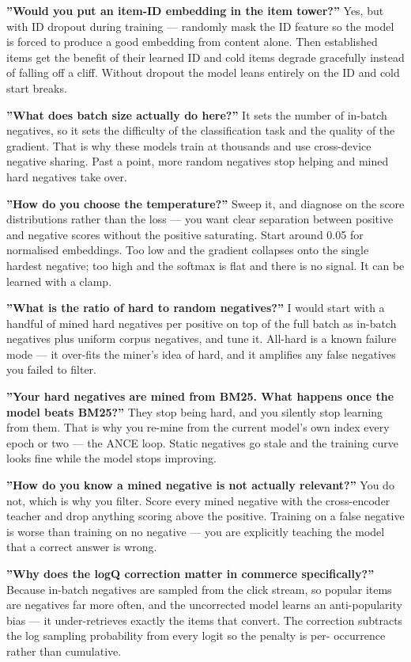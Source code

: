 \documentclass[10pt,twoside]{book}
\begin{document}
\textbf{''Would you put an item-ID embedding in the item tower?''} Yes, but with ID dropout during training --- randomly mask the ID feature so the model is forced to produce a good embedding from content alone. Then established items get the benefit of their learned ID and cold items degrade gracefully instead of falling off a cliff. Without dropout the model leans entirely on the ID and cold start breaks.\par
\textbf{''What does batch size actually do here?''} It sets the number of in-batch negatives, so it sets the difficulty of the classification task and the quality of the gradient. That is why these models train at thousands and use cross-device negative sharing. Past a point, more random negatives stop helping and mined hard negatives take over.\par
\textbf{''How do you choose the temperature?''} Sweep it, and diagnose on the score distributions rather than the loss --- you want clear separation between positive and negative scores without the positive saturating. Start around 0.05 for normalised embeddings. Too low and the gradient collapses onto the single hardest negative; too high and the softmax is flat and there is no signal. It can be learned with a clamp.\par
\textbf{''What is the ratio of hard to random negatives?''} I would start with a handful of mined hard negatives per positive on top of the full batch as in-batch negatives plus uniform corpus negatives, and tune it. All-hard is a known failure mode --- it over-fits the miner's idea of hard, and it amplifies any false negatives you failed to filter.\par
\textbf{''Your hard negatives are mined from BM25. What happens once the model beats BM25?''} They stop being hard, and you silently stop learning from them. That is why you re-mine from the current model's own index every epoch or two --- the ANCE loop. Static negatives go stale and the training curve looks fine while the model stops improving.\par
\textbf{''How do you know a mined negative is not actually relevant?''} You do not, which is why you filter. Score every mined negative with the cross-encoder teacher and drop anything scoring above the positive. Training on a false negative is worse than training on no negative --- you are explicitly teaching the model that a correct answer is wrong.\par
\textbf{''Why does the logQ correction matter in commerce specifically?''} Because in-batch negatives are sampled from the click stream, so popular items are negatives far more often, and the uncorrected model learns an anti-popularity bias --- it under-retrieves exactly the items that convert. The correction subtracts the log sampling probability from every logit so the penalty is per- occurrence rather than cumulative.\par
\end{document}
